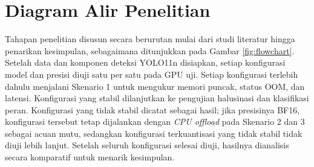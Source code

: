 \section{Diagram Alir Penelitian}
Tahapan penelitian disusun secara berurutan mulai dari studi literatur hingga penarikan kesimpulan, sebagaimana ditunjukkan pada Gambar \ref{fig:flowchart}. Setelah data dan komponen deteksi YOLO11n disiapkan, setiap konfigurasi model dan presisi diuji satu per satu pada GPU uji. Setiap konfigurasi terlebih dahulu menjalani Skenario 1 untuk mengukur memori puncak, status OOM, dan latensi. Konfigurasi yang stabil dilanjutkan ke pengujian halusinasi dan klasifikasi peran. Konfigurasi yang tidak stabil dicatat sebagai hasil; jika presisinya BF16, konfigurasi tersebut tetap dijalankan dengan \textit{CPU offload} pada Skenario 2 dan 3 sebagai acuan mutu, sedangkan konfigurasi terkuantisasi yang tidak stabil tidak diuji lebih lanjut. Setelah seluruh konfigurasi selesai diuji, hasilnya dianalisis secara komparatif untuk menarik kesimpulan.

